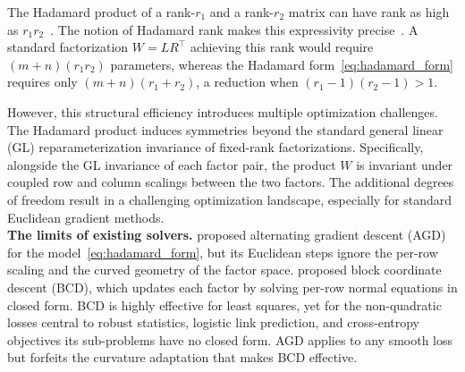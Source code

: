 \documentclass[letterpaper, 10 pt, conference]{ieeeconf}
\newcommand{\Had}{\circ}
\theoremstyle{plain}
\theoremstyle{definition}
\theoremstyle{remark}
\newcommand{\alertbyPJ}[1]{\textcolor{red}{\footnotesize [!PJ: #1!]}}
\newcommand{\BMorig}[1]{{#1}}%
\begin{document}
The Hadamard product of a rank-$r_1$ and a rank-$r_2$ matrix can have rank as high as $r_1 r_2$~\cite{ciaperoni2024hadamard}. The notion of Hadamard rank makes this expressivity precise~\cite{antolini2025hadamardranks}. A standard factorization $W = LR^\top$ achieving this rank would require $(m{+}n)(r_1r_2)$ parameters, whereas the Hadamard form~\eqref{eq:hadamard_form} requires only $(m{+}n)(r_1{+}r_2)$, a reduction \BMorig{when $(r_1{-}1)(r_2{-}1)>1$}. 

However, this structural efficiency introduces multiple optimization challenges. The Hadamard product induces symmetries beyond the standard general linear (GL) reparameterization invariance of fixed-rank factorizations. Specifically, alongside the GL invariance of each factor pair, the product $W$ is invariant under coupled row and column scalings between the two factors. The additional degrees of freedom result in a challenging optimization landscape, especially for standard Euclidean gradient methods.\\



\noindent \textbf{The limits of existing solvers.} \citet{ciaperoni2024hadamard} proposed alternating gradient descent (AGD) for the model~\eqref{eq:hadamard_form}, but its Euclidean steps ignore the per-row scaling and the curved geometry of the factor space. \citet{wertz2024bcd} proposed block coordinate descent (BCD), which updates each factor by solving per-row normal equations in closed form. BCD is highly effective for least squares, yet for the non-quadratic losses central to robust statistics, logistic link prediction, and cross-entropy objectives its sub-problems have no closed form. AGD applies to any smooth loss but forfeits the curvature adaptation that makes BCD effective.
\end{document}
